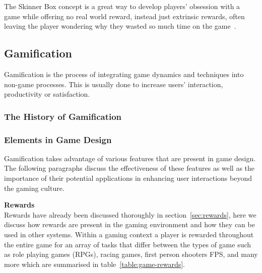 \documentclass[a4paper,12pt]{article}
\begin{document}
\par
The Skinner Box concept is a great way to develop players’ obsession with a game while offering no real world reward, instead just extrinsic rewards, often leaving the player wondering why they wasted so much time on the game~\citep{fiveCreepyWays,bread-and-games}. 

\subsection{Gamification}\label{sec:gamification}
Gamification is the process of integrating game dynamics and techniques into non-game processes. This is usually done to increase users' interaction, productivity or satisfaction.

\subsubsection{The History of Gamification}

\subsubsection{Elements in Game Design}
Gamification takes advantage of various features that are present in game design. The following paragraphs discuss the effectiveness of these features as well as the importance of their potential applications in enhancing user interactions beyond the gaming culture. 

\par
\textbf{Rewards}\\
Rewards have already been discussed thoroughly in section~\ref{sec:rewards}, here we discuss how rewards are present in the gaming environment and how they can be used in other systems. 
Within a gaming context a player is rewarded throughout the entire game for an array of tasks that differ between the types of game such as role playing games (RPGs), racing games, first person shooters {FPS}, and many more which are summarised in table~\ref{table:game-rewards}.
\end{document}
